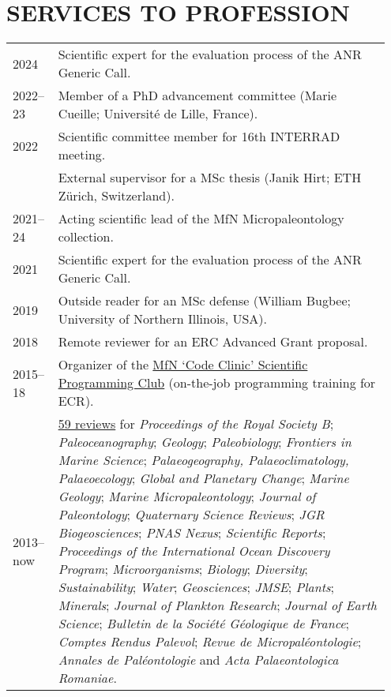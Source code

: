 \documentclass[11pt, a4paper]{article}
\begin{document}
\section{SERVICES TO PROFESSION}
\begin{longtable}{@{}p{0.1\linewidth} >{\small}P{0.85\linewidth}@{}}
    2024 & Scientific expert for the evaluation process of the ANR Generic Call.\\
2022--23 & Member of a PhD advancement committee (Marie Cueille; Université de Lille, France).\\
2022 & Scientific committee member for 16th INTERRAD meeting.\\
     & External supervisor for a MSc thesis (Janik Hirt; ETH Zürich, Switzerland).\\
2021--24 & Acting scientific lead of the MfN Micropaleontology collection.\\
2021 & Scientific expert for the evaluation process of the ANR Generic Call.\\
2019 & Outside reader for an MSc defense (William Bugbee; University of Northern Illinois, USA).\\
2018 & Remote reviewer for an ERC Advanced Grant proposal.\\
2015--18 & Organizer of the \href{https://github.com/plannapus/MfN-Code-Clinic}{MfN `Code Clinic' Scientific Programming Club} (on-the-job programming training for ECR). \\
2013--now  & \href{https://www.webofscience.com/wos/author/record/540612}{59 reviews} for \textit{Proceedings of the Royal Society B}; \textit{Paleoceanography}; \textit{Geology}; \textit{Paleobiology}; \textit{Frontiers in Marine Science}; \textit{Palaeo\-geography, Palaeo\-climatology, Palaeo\-ecology}; \textit{Global and Planetary Change}; \textit{Marine Geology}; \textit{Marine Micropaleontology}; \textit{Journal of Paleontology}; \textit{Quaternary Science Reviews}; \textit{JGR Biogeosciences}; \textit{PNAS Nexus}; \textit{Scientific Reports}; \textit{Proceedings of the International Ocean Discovery Program}; \textit{Microorganisms}; \textit{Biology}; \textit{Diversity}; \textit{Sustainability}; \textit{Water}; \textit{Geosciences}; \textit{JMSE}; \textit{Plants}; \textit{Minerals}; \textit{Journal of Plankton Research}; \textit{Journal of Earth Science}; \textit{Bulletin de la Soci\'{e}t\'{e} G\'{e}ologique de France}; \textit{Comptes Rendus Palevol}; \textit{Revue de Micropal\'{e}ontologie}; \textit{Annales de Pal\'{e}ontologie} and \textit{Acta Palaeontologica Romaniae}. \\
\end{longtable}
\end{document}
